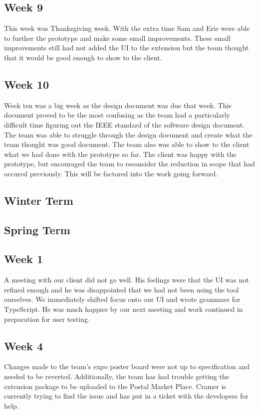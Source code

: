 \documentclass[letterpaper,10pt,titlepage,draftclsnofoot,onecolumn,onesided] {IEEEtran}
\begin{document}
	\subsection{Week 9}
	This week was Thanksgiving week. 
	With the extra time Sam and Eric were able to further the prototype and make some small improvements.
	These small improvements still had not added the UI to the extension but the team thought that it would be good enough to show to the client. 

	\subsection{Week 10}
	Week ten was a big week as the design document was due that week. 
	This document proved to be the most confusing as the team had a particularly difficult time figuring out the IEEE standard of the software design document. 
	The team was able to struggle through the design document and create what the team thought was good document. 
	The team also was able to show to the client what we had done with the prototype so far. 
	The client was happy with the prototype, but encouraged the team to reconsider the reduction in scope that had occured previously.
	This will be factored into the work going forward.
	
	\subsection{Winter Term}
	
	
	\subsection{Spring Term}
	\subsection{Week 1}
	A meeting with our client did not go well. 
	His feelings were that the UI was not refined enough and he was disappointed that we had not been using the tool ourselves.
	We immediately shifted focus onto our UI and wrote grammars for TypeScript.
	He was much happier by our next meeting and work continued in preparation for user testing.
	\subsection{Week 4}
	Changes made to the team's expo poster board were not up to specification and needed to be reverted.
	Additionally, the team has had trouble getting the extension package to be uploaded to the Postal Market Place.
	Cramer is currently trying to find the issue and has put in a ticket with the developers for help.
\end{document}
